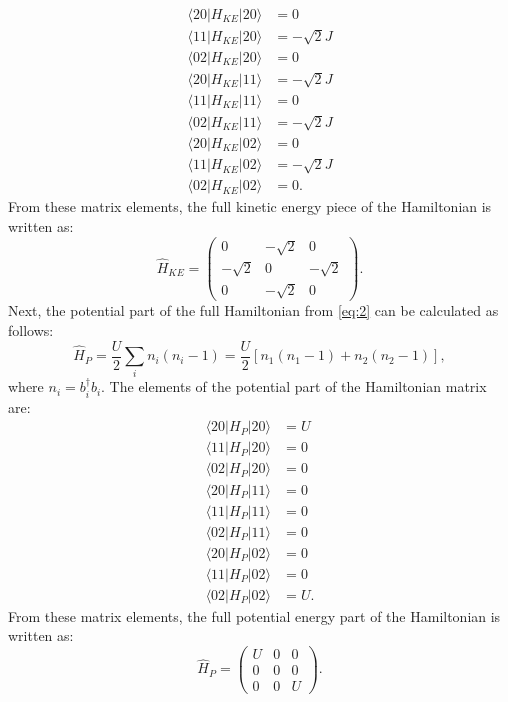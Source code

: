 \begin{align*}
\langle{20|H_{KE}|20\rangle} &=0 \\
\langle{11|H_{KE}|20\rangle} &=-\sqrt{2}J \\
\langle{02|H_{KE}|20\rangle} &=0 \\
\langle{20|H_{KE}|11\rangle} &=-\sqrt{2}J \\
\langle{11|H_{KE}|11\rangle} &=0 \\
\langle{02|H_{KE}|11\rangle} &=-\sqrt{2}J \\
\langle{20|H_{KE}|02\rangle} &=0 \\
\langle{11|H_{KE}|02\rangle} &=-\sqrt{2}J \\
\langle{02|H_{KE}|02\rangle} &=0.
\end{align*}
\noindent From these matrix elements, the full kinetic energy piece of the Hamiltonian is written as:
\begin{equation}
\hat{H}_{KE} = \begin{pmatrix} 0 & -\sqrt{2} & 0 \\ -\sqrt{2} & 0 & -\sqrt{2} \\ 0 & -\sqrt{2} & 0 \end{pmatrix}.
\end{equation}
\noindent Next, the potential part of the full Hamiltonian from \cref{eq:2} can be calculated as follows:
\begin{equation}
\hat{H}_{P} = \frac{U}{2}\sum_i{n_i(n_i - 1)} = \frac{U}{2}[n_1(n_1 - 1) + n_2(n_2 - 1)],
\end{equation}
\noindent where $n_i = b_i^{\dagger}b_i$. The elements of the potential part of the Hamiltonian matrix are:
\begin{align*}
\langle{20|H_{P}|20\rangle} &=U \\
\langle{11|H_{P}|20\rangle} &=0 \\
\langle{02|H_{P}|20\rangle} &=0 \\
\langle{20|H_{P}|11\rangle} &=0 \\
\langle{11|H_{P}|11\rangle} &=0 \\
\langle{02|H_{P}|11\rangle} &=0 \\
\langle{20|H_{P}|02\rangle} &=0 \\
\langle{11|H_{P}|02\rangle} &=0 \\
\langle{02|H_{P}|02\rangle} &=U.
\end{align*}
\noindent From these matrix elements, the full potential energy part of the Hamiltonian is written as:
\begin{equation}
\hat{H}_{P} = \begin{pmatrix} U & 0 & 0 \\ 0 & 0 & 0 \\ 0 & 0 & U \end{pmatrix}.
\end{equation}
